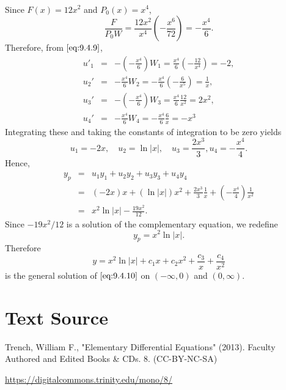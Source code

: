 \documentclass{ximera}
\begin{document}
\begin{example}
\begin{explanation}
\begin{eqnarray*}
\end{eqnarray*}
 Since $F(x)=12x^2$ and $P_0(x)=x^4$,
$$
\frac{F}{P_0W}=\frac{12x^2}{x^4}\left(-\frac{x^6}{72}\right)=-\frac{x^4}{6}.
$$
Therefore, from $\eqref{eq:9.4.9}$,
\begin{eqnarray*}
u'_1&=&-\left(-\frac{x^4}{6}\right)W_1=\frac{x^4}{6}\left(-\frac{12}{x^4}\right)=-2,\\
 u_2'&=&-\frac{x^4}{6}W_2=-\frac{x^4}{6}\left(-\frac{6}{x^5}\right)
=\frac{1}{x},\\
u_3'&=&-\left(-\frac{x^4}{6}\right)W_3=\frac{x^4}{6}\frac{12}{x^2}=2x^2,\\
  u_4'&=&-\frac{x^4}{6}W_4=-\frac{x^4}{6}\frac{6}{x}=-x^3
\end{eqnarray*}
 Integrating these and taking the constants of
integration to be zero yields
$$
u_1=-2x,\quad u_2=\ln|x|,\quad u_3=\frac{2x^3}{3},
u_4=-\frac{x^4}{4}.
$$
Hence,
\begin{eqnarray*}
y_p&=&u_1y_1+u_2y_2+u_3y_3+u_4y_4\\
&=&(-2x)x+(\ln|x|)x^2+\frac{2x^3}{3}\frac{1}{x}+\left(-\frac{x^4}{4}\right)
\frac{1}{x^2} \\&=&x^2\ln|x|-\frac{19x^2}{12}.
\end{eqnarray*}
Since $-19x^2/12$ is a solution of the complementary equation, we redefine
$$
y_p=x^2\ln|x|.
$$
 Therefore
$$
y=x^2\ln|x|+c_1x+c_2x^2+\frac{c_3}{x}+\frac{c_4}{x^2}
$$
is the general solution of $\eqref{eq:9.4.10}$ on $(-\infty,0)$ and $(0,\infty)$.
\end{explanation}
\end{example}




\section*{Text Source}
Trench, William F., "Elementary Differential Equations" (2013). Faculty Authored and Edited Books \& CDs. 8. (CC-BY-NC-SA)

\href{https://digitalcommons.trinity.edu/mono/8/}{https://digitalcommons.trinity.edu/mono/8/}
\end{document}
